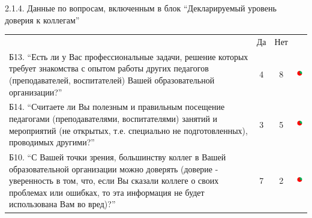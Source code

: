 \begin{frame}{2.1.4. Данные по вопросам, включенным в блок ``Декларируемый уровень доверия к коллегам'' }

\tiny


\begin{tabular}{lccl}

 & Да & Нет &\\

\begin{minipage}{0.62\textwidth}
Б13.  ``Есть ли у Вас профессиональные задачи, решение которых требует знакомства с опытом работы других педагогов (преподавателей, воспитателей) Вашей образовательной организации?''
\end{minipage}
& 4 & 8 &
\begin{minipage}{1.55cm}
\includegraphics[width=1.5cm, height=1.5cm]{diag.png}
\end{minipage}
\\[0.5cm]

\begin{minipage}{0.62\textwidth}
Б14. ``Считаете ли Вы полезным и правильным посещение педагогами (преподавателями, воспитателями)  занятий и мероприятий (не открытых, т.е. специально не подготовленных), проводимых другими?''
\end{minipage}
& 3 & 5 & 
\begin{minipage}{1.55cm}
\includegraphics[width=1.5cm, height=1.5cm]{diag.png}
\end{minipage}
\\[0.5cm]

\begin{minipage}{0.62\textwidth}
Б10. ``С Вашей точки зрения, большинству коллег в Вашей образовательной организации можно доверять (доверие - уверенность в том, что, если Вы сказали коллеге о своих проблемах или ошибках, то эта информация не будет использована Вам во вред)?''
\end{minipage}
& 7 & 2 &
\begin{minipage}{1.55cm}
\includegraphics[width=1.5cm, height=1.5cm]{diag.png}
\end{minipage}
\\[0.5cm]


\end{tabular}
\end{frame}
